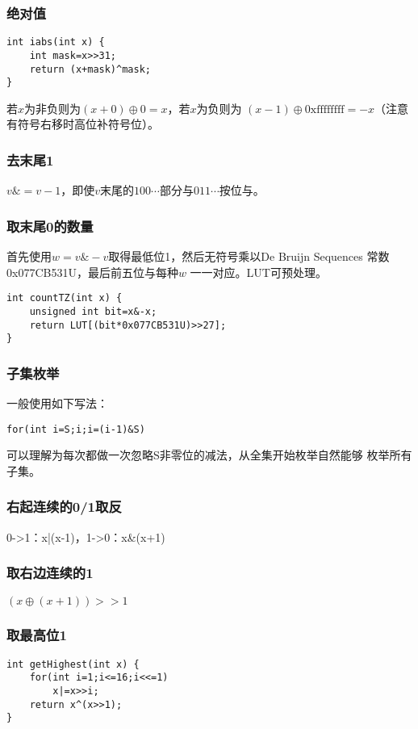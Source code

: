 \subsubsection{绝对值}
\begin{lstlisting}
int iabs(int x) {
    int mask=x>>31;
    return (x+mask)^mask;
}
\end{lstlisting}

若$x$为非负则为$(x+0)\oplus 0=x$，若$x$为负则为
$(x-1)\oplus \textrm{0xffffffff}=-x$（注意有符号右移时高位补符号位）。
\subsubsection{去末尾1}
$v\&=v-1$，即使$v$末尾的$100\cdots$部分与$011\cdots$按位与。
\subsubsection{取末尾0的数量}
首先使用$w=v\&-v$取得最低位1，然后无符号乘以De Bruijn Sequences
常数0x077CB531U，最后前五位与每种$w$
一一对应。LUT可预处理。
\begin{lstlisting}
int countTZ(int x) {
    unsigned int bit=x&-x;
    return LUT[(bit*0x077CB531U)>>27];
}
\end{lstlisting}
\subsubsection{子集枚举}
一般使用如下写法：
\begin{lstlisting}
for(int i=S;i;i=(i-1)&S)
\end{lstlisting}

可以理解为每次都做一次忽略S非零位的减法，从全集开始枚举自然能够
枚举所有子集。
\subsubsection{右起连续的0/1取反}
0->1：x|(x-1)，1->0：x\&(x+1)
\subsubsection{取右边连续的1}
$(x \oplus (x+1))>>1$
\subsubsection{取最高位1}
\begin{lstlisting}
int getHighest(int x) {
    for(int i=1;i<=16;i<<=1)
        x|=x>>i;
    return x^(x>>1);
}
\end{lstlisting}

